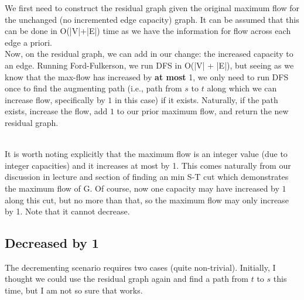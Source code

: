 \documentclass[conference]{styles/acmsiggraph}
\newcommand{\?}{\stackrel{?}{=}}
\DeclareRobustCommand{\mybox}[2][gray!20]{%
\begin{tcolorbox}[   %
        breakable,
        left=0pt,
        right=0pt,
        top=0pt,
        bottom=0pt,
        colback=#1,
        colframe=#1,
        width=\dimexpr\textwidth\relax, 
        enlarge left by=0mm,
        boxsep=5pt,
        arc=0pt,outer arc=0pt,
        ]
        #2
\end{tcolorbox}
}
\begin{document}
\mybox{
We first need to construct the residual graph given the original maximum flow for the unchanged (no incremented edge capacity) graph.  It can be assumed that this can be done in O(|V|+|E|) time as we have the information for flow across each edge a priori. \\

Now, on the residual graph, we can add in our change: the increased capacity to an edge.  Running Ford-Fulkerson, we run DFS in O(|V| + |E|), but seeing as we know that the max-flow has increased by \textbf{at most} 1, we only need to run DFS once to find the augmenting path (i.e., path from $s$ to $t$ along which we can increase flow, specifically by $1$ in this case) if it exists.  Naturally, if the path exists, increase the flow, add $1$ to our prior maximum flow, and return the new residual graph.}\\

It is worth noting explicitly that the maximum flow is an integer value (due to integer capacities) and it increases at most by 1.  This comes naturally from our discussion in lecture and section of finding an min S-T cut which demonstrates the maximum flow of G.  Of course, now one capacity may have increased by $1$ along this cut, but no more than that, so the maximum flow may only increase by 1.  Note that it cannot decrease.

\subsection{Decreased by 1}
The decrementing scenario requires two cases (quite non-trivial).  Initially, I thought we could use the residual graph again and find a path from $t$ to $s$ this time, but I am not so sure that works.\\
\end{document}
